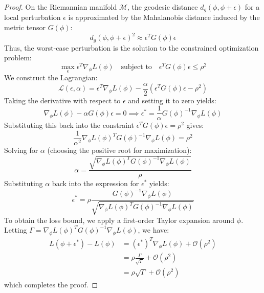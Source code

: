 \documentclass{article}
\theoremstyle{plain}
\theoremstyle{definition}
\theoremstyle{remark}
\begin{document}
\begin{proof}
On the Riemannian manifold $\mathcal{M}$, the geodesic distance $d_g(\phi, \phi + \epsilon)$ for a local perturbation $\epsilon$ is approximated by the Mahalanobis distance induced by the metric tensor $G(\phi)$:
\begin{equation}
  d_g(\phi, \phi + \epsilon)^2 \approx \epsilon^T G(\phi) \epsilon
\end{equation}
Thus, the worst-case perturbation is the solution to the constrained optimization problem:
\begin{equation}
  \max_{\epsilon} \epsilon^T \nabla_{\phi} L(\phi) \quad \text{subject to} \quad \epsilon^T G(\phi) \epsilon \leq \rho^2
\end{equation}
We construct the Lagrangian:
\begin{equation}
  \mathcal{L}(\epsilon, \alpha) = \epsilon^T \nabla_{\phi} L(\phi) - \frac{\alpha}{2} \left( \epsilon^T G(\phi) \epsilon - \rho^2 \right)
\end{equation}
Taking the derivative with respect to $\epsilon$ and setting it to zero yields:
\begin{equation}
  \nabla_{\phi} L(\phi) - \alpha G(\phi) \epsilon = 0 \implies \epsilon^* = \frac{1}{\alpha} G(\phi)^{-1} \nabla_{\phi} L(\phi)
\end{equation}
Substituting this back into the constraint $\epsilon^T G(\phi) \epsilon = \rho^2$ gives:
\begin{equation}
  \frac{1}{\alpha^2} \nabla_{\phi} L(\phi)^T G(\phi)^{-1} \nabla_{\phi} L(\phi) = \rho^2
\end{equation}
Solving for $\alpha$ (choosing the positive root for maximization):
\begin{equation}
  \alpha = \frac{\sqrt{\nabla_{\phi} L(\phi)^T G(\phi)^{-1} \nabla_{\phi} L(\phi)}}{\rho}
\end{equation}
Substituting $\alpha$ back into the expression for $\epsilon^*$ yields:
\begin{equation}
  \epsilon^* = \rho \frac{G(\phi)^{-1} \nabla_{\phi} L(\phi)}{\sqrt{\nabla_{\phi} L(\phi)^T G(\phi)^{-1} \nabla_{\phi} L(\phi)}}
\end{equation}
To obtain the loss bound, we apply a first-order Taylor expansion around $\phi$. Letting $\Gamma = \nabla_{\phi} L(\phi)^T G(\phi)^{-1} \nabla_{\phi} L(\phi)$, we have:
\begin{align}
  L(\phi + \epsilon^*) - L(\phi) &= (\epsilon^*)^T \nabla_{\phi} L(\phi) + \mathcal{O}(\rho^2) \\
  &= \rho \frac{\Gamma}{\sqrt{\Gamma}} + \mathcal{O}(\rho^2) \\
  &= \rho \sqrt{\Gamma} + \mathcal{O}(\rho^2)
\end{align}
which completes the proof.
\end{proof}
\end{document}
